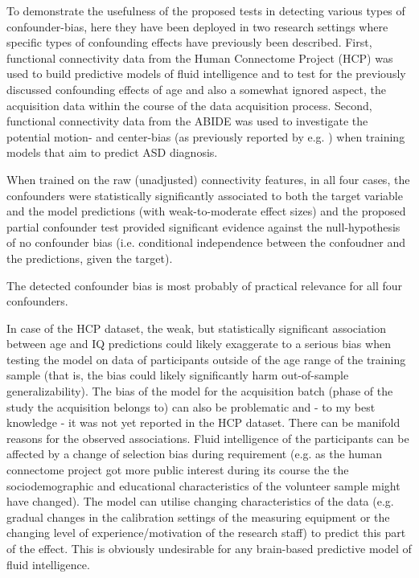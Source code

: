 \documentclass{article}
\begin{document}
To demonstrate the usefulness of the proposed tests in detecting various types of confounder-bias, here they have been deployed in two research settings where specific types of confounding effects have previously been described. 
First, functional connectivity data from the Human Connectome Project (HCP) \citep{van2013wu} was used to build predictive models of fluid intelligence and to test for the previously discussed confounding effects of age \cite{lohmann2021predicting, dubois2018distributed} and also a somewhat ignored aspect, the acquisition data within the course of the data acquisition process.
Second, functional connectivity data from the ABIDE \citep{di2014autism} was used to investigate the potential motion- and center-bias (as previously reported by e.g. \cite{spisak2014voxel, spisak2019optimal, gotts2013perils}) when training models that aim to predict ASD diagnosis.

When trained on the raw (unadjusted) connectivity features, in all four cases, the confounders were statistically significantly associated to both the target variable and the model predictions (with weak-to-moderate effect sizes) and the proposed partial confounder test provided significant evidence against the null-hypothesis of no confounder bias (i.e. conditional independence between the confoudner and the predictions, given the target). 

The detected confounder bias is most probably of practical relevance for all four confounders. 


In case of the HCP dataset, the weak, but statistically significant association between age and IQ predictions could likely exaggerate to a serious bias when testing the model on data of participants outside of the age range of the training sample (that is, the bias could likely significantly harm out-of-sample generalizability). The bias of the model for the acquisition batch (phase of the study the acquisition belongs to) can also be problematic and - to my best knowledge - it was not yet reported in the HCP dataset. There can be manifold reasons for the observed associations. Fluid intelligence of the participants can be affected by a change of selection bias during requirement (e.g. as the human connectome project got more public interest during its course the the sociodemographic and educational characteristics of the volunteer sample might have changed). The model can utilise changing characteristics of the data (e.g. gradual changes in the calibration settings of the measuring equipment or the changing level of experience/motivation of the research staff) to predict this part of the effect. This is obviously undesirable for any brain-based predictive model of fluid intelligence.
\end{document}
